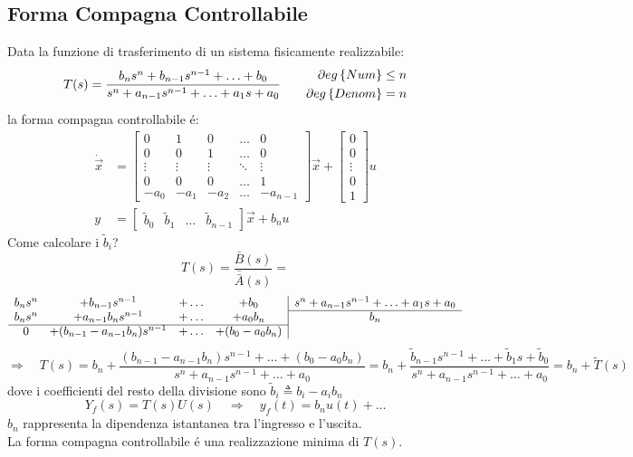 \documentclass[../main.tex]{subfiles}
\begin{document}
	\subsection{Forma Compagna Controllabile}
		Data la funzione di trasferimento di un sistema fisicamente realizzabile:
		\[
			T(s) = \dfrac{b_n s^n + b_{n-1} s^{n-1} + \ldots + b_0}{s^n + a_{n-1} s^{n-1} + \ldots + a_1 s + a_0}
			\qquad
			\begin{aligned}
				\partial eg \left\lbrace Num \right\rbrace \leq n\\
				\partial eg \left\lbrace Denom \right\rbrace = n
			\end{aligned}
		\]
		la forma compagna controllabile \'e:
		\[
			\begin{aligned}
				\dot{\vec x} &=
				\begin{bmatrix}
					0 & 1 & 0 & \dots & 0\\
					0 & 0 & 1 & \dots & 0\\
					\vdots & \vdots & \vdots & \ddots & \vdots\\
					0 & 0 & 0 & \dots & 1\\
					-a_0 & -a_1 & -a_2 & \dots & -a_{n-1}
				\end{bmatrix} \vec x+
				\begin{bmatrix}
					0\\
					0\\
					\vdots\\
					0\\
					1
				\end{bmatrix} u
				\\
				y &=
				\begin{bmatrix}
					\tilde b_0 & \tilde b_1 & \dots & \tilde b_{n-1}
				\end{bmatrix} \vec x + b_n u
			\end{aligned}
		\]
		Come calcolare i $ \tilde b_i $?
		\[
			T(s) = \dfrac{\bar B(s)}{\bar{\bar A}(s)} =
		\]
		\[
			\begin{array}{cccc|c}
				b_n s^n & +b_{n-1} s^{n-1} & +\dots & +b_0 & s^n + a_{n-1} s^{n-1} + \ldots + a_1 s + a_0
				\\\cline{5-5}
				b_n s^n & +a_{n-1} b_n s^{n-1} & +\dots & +a_0 b_n & b_n
				\\\cline{1-4}
				0 & +(b_{n-1} - a_{n-1} b_n) s^{n-1} & +\dots & +(b_0 - a_0 b_n)
			\end{array}
		\]
		\newline
		\[
			\Rightarrow\quad T(s) = b_n + \dfrac{(b_{n-1} - a_{n-1} b_n)s^{n-1} + \dots + (b_0 - a_0 b_n)}{s^n + a_{n-1} s^{n-1} + \dots + a_0} = b_n + \dfrac{\tilde b_{n-1} s^{n-1} + \dots + \tilde b_1 s + \tilde b_0}{s^n + a_{n-1} s^{n-1} + \dots + a_0} = b_n + \tilde T(s)
		\]
		dove i coefficienti del resto della divisione sono $ \tilde b_i \triangleq b_i - a_i b_n $
		\[
			Y_f(s) = T(s) U(s) \quad\Rightarrow\quad y_f(t) = b_n u(t) + \ldots
		\]
		$ b_n $ rappresenta la dipendenza istantanea tra l'ingresso e l'uscita.\\
		\newline
		La forma compagna controllabile \'e una realizzazione minima di $ T(s) $.
		
\end{document}
